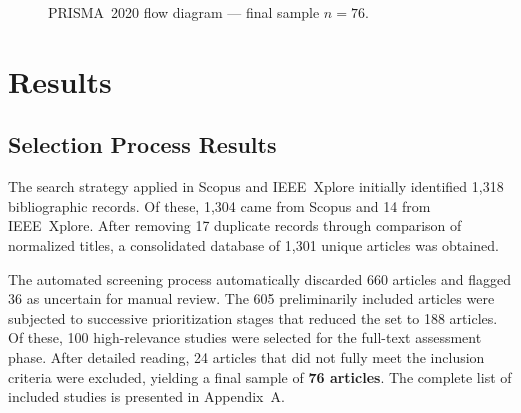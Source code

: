 \documentclass[runningheads]{llncs}
\begin{document}
\begin{figure}[t]
{
}
\caption{PRISMA~2020 flow diagram --- final sample $n = 76$.}
\label{fig:prisma}
\end{figure}

\section{Results}

\subsection{Selection Process Results}

The search strategy applied in Scopus and IEEE~Xplore
initially identified 1,318 bibliographic records. Of these,
1,304 came from Scopus and 14 from IEEE~Xplore. After removing
17 duplicate records through comparison of normalized titles,
a consolidated database of 1,301 unique articles was obtained.

The automated screening process automatically discarded 660
articles and flagged 36 as uncertain for manual review. The
605 preliminarily included articles were subjected to
successive prioritization stages that reduced the set to 188
articles. Of these, 100 high-relevance studies were selected
for the full-text assessment phase. After detailed reading, 24 articles that did not fully meet
the inclusion criteria were excluded, yielding a final sample
of \textbf{76 articles}. The complete list of included
studies is presented in Appendix~A.
\end{document}
